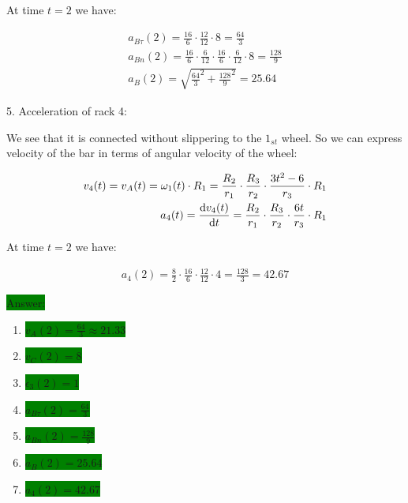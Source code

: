 \documentclass{article}
\begin{document}
At time $t = 2$ we have:

\begin{align}
    a_{B\tau}(2) = \frac{16}{6} \cdot \frac{12}{12} \cdot 8 = \frac{64}{3}                                    \\
    a_{Bn}(2) = \frac{16}{6} \cdot \frac{6}{12} \cdot \frac{16}{6} \cdot \frac{6}{12} \cdot 8 = \frac{128}{9} \\
    a_{B}(2) = \sqrt{\frac{64}{3}^2 + \frac{128}{9}^2} = 25.64
\end{align}

5. Acceleration of rack 4:

We see that it is connected without slippering to the $1_{st}$ wheel.
So we can express velocity of the bar in terms of angular velocity of the wheel:

\begin{align}
    v_{4}(t) = v_A(t) = \omega_1(t) \cdot R_1 = \frac{R_2}{r_1} \cdot \frac{R_3}{r_2} \cdot \frac{3t^2 - 6}{r_3} \cdot {R_1} \\
    a_{4}(t) = \dv{v_{4}(t)}{t} = \frac{R_2}{r_1} \cdot \frac{R_3}{r_2} \cdot \frac{6t}{r_3} \cdot {R_1}
\end{align}

At time $t = 2$ we have:

\begin{align}
    a_{4}(2) = \frac{8}{2} \cdot \frac{16}{6} \cdot \frac{12}{12} \cdot 4 = \frac{128}{3} = 42.67
\end{align}

\colorbox{green}{Answer:}

\begin{enumerate}
    \item \colorbox{green}{$v_A(2) = \frac{64}{3} \approx 21.33$}
    \item \colorbox{green}{$v_C(2) = 8$}
    \item \colorbox{green}{$\epsilon_3(2) = 1$}
    \item \colorbox{green}{$a_{B\tau}(2) = \frac{64}{3}$}
    \item \colorbox{green}{$a_{Bn}(2) = \frac{128}{9}$}
    \item \colorbox{green}{$a_{B}(2) = 25.64$}
    \item \colorbox{green}{$a_{4}(2) = 42.67$}
\end{enumerate}
\end{document}
